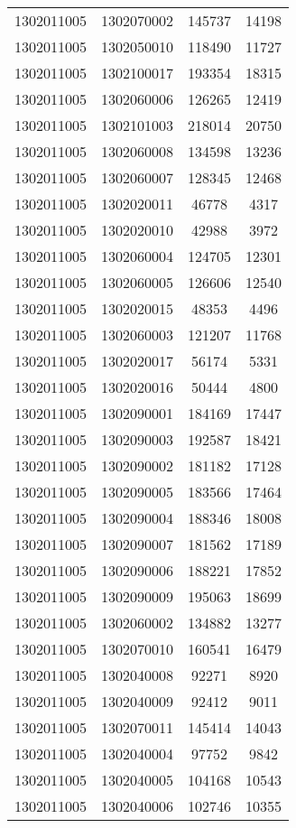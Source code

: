 \begin{longtable}[h]{llcc}
		1302011005 & 1302070002 & 145737 & 14198\\
		1302011005 & 1302050010 & 118490 & 11727\\
		1302011005 & 1302100017 & 193354 & 18315\\
		1302011005 & 1302060006 & 126265 & 12419\\
		1302011005 & 1302101003 & 218014 & 20750\\
		1302011005 & 1302060008 & 134598 & 13236\\
		1302011005 & 1302060007 & 128345 & 12468\\
		1302011005 & 1302020011 & 46778 & 4317\\
		1302011005 & 1302020010 & 42988 & 3972\\
		1302011005 & 1302060004 & 124705 & 12301\\
		1302011005 & 1302060005 & 126606 & 12540\\
		1302011005 & 1302020015 & 48353 & 4496\\
		1302011005 & 1302060003 & 121207 & 11768\\
		1302011005 & 1302020017 & 56174 & 5331\\
		1302011005 & 1302020016 & 50444 & 4800\\
		1302011005 & 1302090001 & 184169 & 17447\\
		1302011005 & 1302090003 & 192587 & 18421\\
		1302011005 & 1302090002 & 181182 & 17128\\
		1302011005 & 1302090005 & 183566 & 17464\\
		1302011005 & 1302090004 & 188346 & 18008\\
		1302011005 & 1302090007 & 181562 & 17189\\
		1302011005 & 1302090006 & 188221 & 17852\\
		1302011005 & 1302090009 & 195063 & 18699\\
		1302011005 & 1302060002 & 134882 & 13277\\
		1302011005 & 1302070010 & 160541 & 16479\\
		1302011005 & 1302040008 & 92271 & 8920\\
		1302011005 & 1302040009 & 92412 & 9011\\
		1302011005 & 1302070011 & 145414 & 14043\\
		1302011005 & 1302040004 & 97752 & 9842\\
		1302011005 & 1302040005 & 104168 & 10543\\
		1302011005 & 1302040006 & 102746 & 10355\\

\end{longtable}
